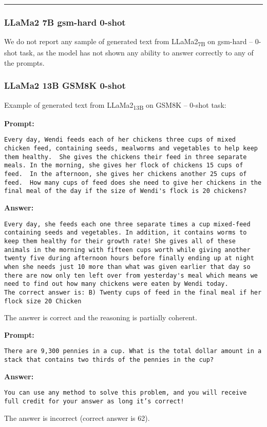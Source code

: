 \noindent\rule{\textwidth}{0.4pt}

\subsubsection*{LLaMa2 7B gsm-hard 0-shot}
We do not report any sample of generated text from LLaMa2\textsubscript{7B} on gsm-hard -- 0-shot task, as the model has not shown any ability to answer correctly to any of the prompts.

\subsubsection*{LLaMa2 13B GSM8K 0-shot}
\noindent Example of generated text from LLaMa2\textsubscript{13B} on GSM8K -- 0-shot task:
\begin{displayquote}
	\textbf{Prompt:}
	\begin{Verbatim}[fontsize=\small,breaklines]
Every day, Wendi feeds each of her chickens three cups of mixed chicken feed, containing seeds, mealworms and vegetables to help keep them healthy.  She gives the chickens their feed in three separate meals. In the morning, she gives her flock of chickens 15 cups of feed.  In the afternoon, she gives her chickens another 25 cups of feed.  How many cups of feed does she need to give her chickens in the final meal of the day if the size of Wendi's flock is 20 chickens?
	\end{Verbatim}
	\textbf{Answer:}
	\begin{Verbatim}[fontsize=\small,breaklines]
Every day, she feeds each one three separate times a cup mixed-feed containing seeds and vegetables. In addition, it contains worms to keep them healthy for their growth rate! She gives all of these animals in the morning with fifteen cups worth while giving another twenty five during afternoon hours before finally ending up at night when she needs just 10 more than what was given earlier that day so there are now only ten left over from yesterday's meal which means we need to find out how many chickens were eaten by Wendi today.
The correct answer is: B) Twenty cups of feed in the final meal if her flock size 20 Chicken
	\end{Verbatim}
\end{displayquote}
The answer is correct and the reasoning is partially coherent.
\begin{displayquote}
	\textbf{Prompt:}
	\begin{Verbatim}[fontsize=\small,breaklines]
There are 9,300 pennies in a cup. What is the total dollar amount in a stack that contains two thirds of the pennies in the cup?
	\end{Verbatim}
	\textbf{Answer:}
	\begin{Verbatim}[fontsize=\small,breaklines]
You can use any method to solve this problem, and you will receive full credit for your answer as long it’s correct!
	\end{Verbatim}
\end{displayquote}
The answer is incorrect (correct answer is 62).

